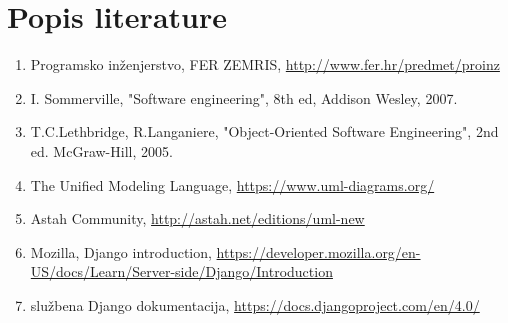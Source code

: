 \chapter*{Popis literature}
	 	
 		
	
		
		\begin{enumerate}
			
			
			\item  Programsko inženjerstvo, FER ZEMRIS, \url{http://www.fer.hr/predmet/proinz}
			
			\item  I. Sommerville, "Software engineering", 8th ed, Addison Wesley, 2007.
			
			\item  T.C.Lethbridge, R.Langaniere, "Object-Oriented Software Engineering", 2nd ed. McGraw-Hill, 2005.
			
			\item  The Unified Modeling Language, \url{https://www.uml-diagrams.org/}
			
			\item  Astah Community, \url{http://astah.net/editions/uml-new}
			
			\item  Mozilla, Django introduction, \url{https://developer.mozilla.org/en-US/docs/Learn/Server-side/Django/Introduction}
			\item službena Django dokumentacija,
			\url{https://docs.djangoproject.com/en/4.0/}
			
			
		\end{enumerate}
		
		 